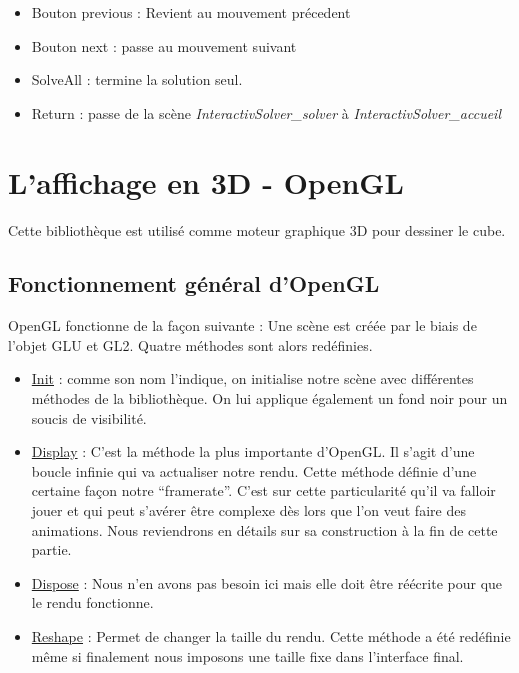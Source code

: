 \begin{itemize}
    \item Bouton previous : Revient au mouvement précedent
    \item Bouton next : passe au mouvement suivant 
    \item SolveAll : termine la solution seul.
    \item Return : passe de la scène \textit{InteractivSolver\_solver} à \textit{InteractivSolver\_accueil}
\end{itemize}

\section{L'affichage en 3D - OpenGL}

Cette bibliothèque est utilisé comme moteur graphique 3D pour dessiner le cube.

\subsection{Fonctionnement général d'OpenGL}
OpenGL fonctionne de la façon suivante :
	Une scène est créée par le biais de l’objet GLU et GL2.
	Quatre méthodes sont alors redéfinies.

\begin{itemize}
    \item \underline{Init} : comme son nom l’indique, on initialise notre scène avec différentes méthodes de la bibliothèque. On lui applique également un fond noir pour un soucis de visibilité.

    \item \underline{Display} : C’est la méthode la plus importante d’OpenGL. Il s’agit d’une boucle infinie qui va actualiser notre rendu. Cette méthode définie d’une certaine façon notre “framerate”.
C’est sur cette particularité qu’il va falloir jouer et qui peut s’avérer être complexe dès lors que l’on veut faire des animations. Nous reviendrons en détails sur sa construction à la fin de cette partie.

\item \underline{Dispose}  : Nous n’en avons pas besoin ici mais elle doit être réécrite pour que le rendu fonctionne.

\item \underline{Reshape} : Permet de changer la taille du rendu. Cette méthode a été redéfinie même si finalement nous imposons une taille fixe dans l’interface final.

\end{itemize}

